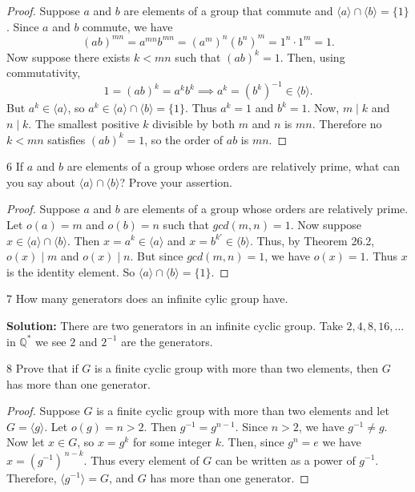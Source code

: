 \begin{proof}
    Suppose $a$ and $b$ are elements of a group that commute and $\langle a \rangle \cap \langle b \rangle = \{1\}$.  
    Since $a$ and $b$ commute, we have
    \[
    (ab)^{mn} = a^{mn} b^{mn} = (a^m)^n (b^n)^m = 1^n \cdot 1^m = 1.
    \]
    Now suppose there exists $k < mn$ such that $(ab)^k = 1$.  
    Then, using commutativity,
    \[
    1 = (ab)^k = a^k b^k \implies a^k = (b^k)^{-1} \in \langle b \rangle.
    \]  
    But $a^k \in \langle a \rangle$, so $a^k \in \langle a \rangle \cap \langle b \rangle = \{1\}$.  
    Thus $a^k = 1$ and $b^k = 1$.  
    Now, $m \mid k$ and $n \mid k$.  
    The smallest positive $k$ divisible by both $m$ and $n$ is $mn$.  
    Therefore no $k < mn$ satisfies $(ab)^k = 1$, so the order of $ab$ is $mn$.
\end{proof}

\begin{problem}{6}
    If $a$ and $b$ are elements of a group whose orders are relatively prime,
    what can you say about $\langle a \rangle \cap \langle b \rangle$? Prove your assertion.
\end{problem}
\solved

\begin{proof}
    Suppose $a$ and $b$ are elements of a group whose orders are relatively prime.
    Let $o(a) = m$ and $o(b) = n$ such that $gcd(m, n) = 1$.
    Now suppose $x \in \langle a \rangle \cap \langle b \rangle$.
    Then $x = a^k \in \langle a \rangle$ and $x = b^{k'} \in \langle b \rangle$.
    Thus, by Theorem 26.2, $o(x) \mid m$ and $o(x) \mid n$.
    But since $gcd(m, n) = 1$, we have $o(x) = 1$.
    Thus $x$ is the identity element.
    So $\langle a \rangle \cap \langle b \rangle = \{1\}$.
\end{proof}

\begin{problem}{7}
    How many generators does an infinite cylic group have.
\end{problem}
\solved

\textbf{Solution: } There are two generators in an infinite cyclic group.
Take $2, 4, 8, 16, \ldots$ in $\mathbb{Q}^*$ we see $2$ and $2^{-1}$ are the generators.

\begin{problem}{8}
    Prove that if $G$ is a finite cyclic group with more than two elements, then $G$ has more than one generator.
\end{problem}
\solved

\begin{proof}
    Suppose $G$ is a finite cyclic group with more than two elements and let $G=\langle g\rangle$.
    Let $o(g)=n>2$. Then $g^{-1}=g^{n-1}$.
    Since $n>2$, we have $g^{-1}\neq g$.
    Now let $x \in G$, so $x = g^k$ for some integer $k$.  
    Then, since $g^n = e$ we have $x = (g^{-1})^{\,n-k}$.
    Thus every element of $G$ can be written as a power of $g^{-1}$.
    Therefore, $\langle g^{-1} \rangle = G$, and $G$ has more than one generator.
\end{proof}

